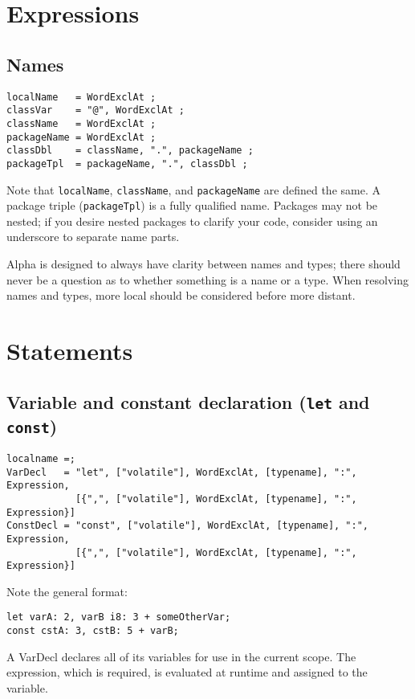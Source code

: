 \documentclass{article}
\begin{document}
\section{Expressions}
\label{sec:expressions}

\subsection{Names}
\label{sub:expressions:names}
\begin{verbatim}
localName   = WordExclAt ;
classVar    = "@", WordExclAt ;
className   = WordExclAt ;
packageName = WordExclAt ;
classDbl    = className, ".", packageName ;
packageTpl  = packageName, ".", classDbl ;
\end{verbatim}

Note that \texttt{localName}, \texttt{className}, and \texttt{packageName} are
defined the same. A package triple (\texttt{packageTpl}) is a fully qualified
name. Packages may not be nested; if you desire nested packages to clarify your
code, consider using an underscore to separate name parts.

Alpha is designed to always have clarity between names and types; there should
never be a question as to whether something is a name or a type. When resolving
names and types, more local should be considered before more distant.

\section{Statements}
\label{sec:statements}

\subsection{Variable and constant declaration (\texttt{let} and \texttt{const})}
\label{sub:statements:vardecl}
\begin{verbatim}
localname =;
VarDecl   = "let", ["volatile"], WordExclAt, [typename], ":", Expression,
            [{",", ["volatile"], WordExclAt, [typename], ":", Expression}]
ConstDecl = "const", ["volatile"], WordExclAt, [typename], ":", Expression,
            [{",", ["volatile"], WordExclAt, [typename], ":", Expression}]
\end{verbatim}
Note the general format:
\begin{verbatim}
let varA: 2, varB i8: 3 + someOtherVar;
const cstA: 3, cstB: 5 + varB;
\end{verbatim}
A VarDecl declares all of its variables for use in the current scope. The
expression, which is required, is evaluated at runtime and assigned to the
variable.
\end{document}
